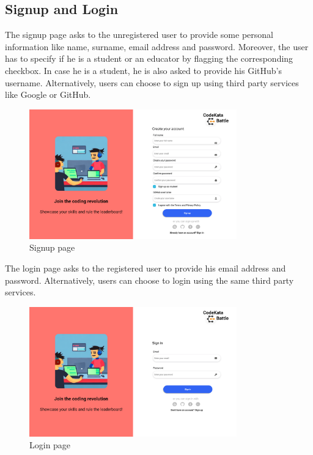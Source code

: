 \subsection{Signup and Login}
The signup page asks to the unregistered user to provide some personal information like name, surname, email address and password. Moreover, the user has to specify if he is a student or an educator by flagging the corresponding checkbox. In case he is a student, he is also asked to provide his GitHub's username. Alternatively, users can choose to sign up using third party services like Google or GitHub.\\
\begin{figure}[H]
    \centering
    \includegraphics[width=0.8\textwidth]{Mockups/1_signup.png}
    \caption{Signup page}
\end{figure}
\newpage
The login page asks to the registered user to provide his email address and password. Alternatively, users can choose to login using the same third party services.\\
\begin{figure}[H]
    \centering
    \includegraphics[width=0.8\textwidth]{Mockups/2_login.png}
    \caption{Login page}
\end{figure}

